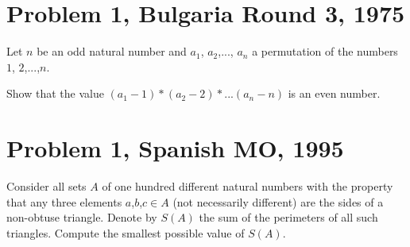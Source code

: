 \documentclass[]{article}
\title{}
\author{}
\begin{document}
\maketitle

\begin{abstract}
\end{abstract}

\section{Problem 1, Bulgaria Round 3, 1975}
Let $n$ be an odd natural number and $a_1$, $a_2$,..., $a_n$ a permutation of the numbers $1$, $2$,...,$n$. 

Show that the value $(a_1-1)*(a_2-2)*...(a_n-n)$ is an even number.

\section{Problem 1, Spanish MO, 1995}
	Consider all sets $A$ of one hundred different natural numbers with the property
	that any three elements $a$,$b$,$c \in A$ (not necessarily different) are the sides of
	a non-obtuse triangle. Denote by $S(A)$ the sum of the perimeters of all such
	triangles. Compute the smallest possible value of $S(A)$.


\section{}
\end{document}

